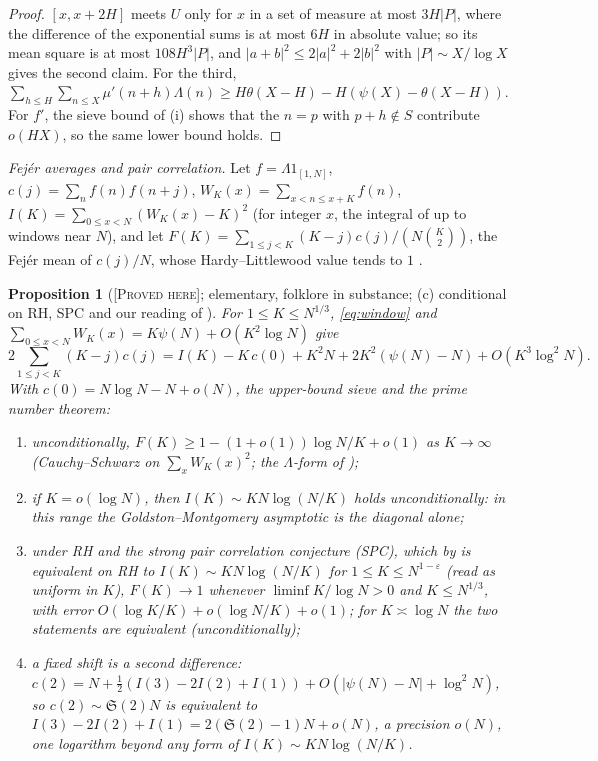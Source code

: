 \documentclass[11pt]{amsart}
\newtheorem{proposition}[theorem]{Proposition}
\theoremstyle{definition}
\theoremstyle{remark}
\newcommand{\lbl}[1]{\textup{\textsc{[#1]}}}
\begin{document}
\begin{proof}
$[x,x+2H]$ meets $U$ only for $x$ in a set of measure at most $3H|P|$, where the
difference of the exponential sums is at most $6H$ in absolute value; so its
mean square is at most $108H^3|P|$, and $|a+b|^2\le2|a|^2+2|b|^2$ with
$|P|\sim X/\log X$ gives the second claim. For the third,
$\sum_{h\le H}\sum_{n\le X}\mu'(n+h)\Lambda(n)\ge H\theta(X-H)-H(\psi(X)-\theta(X-H))$.
For $f'$, the sieve bound of (i) shows that the $n=p$ with $p+h\notin S$
contribute $o(HX)$, so the same lower bound holds.
\end{proof}

\emph{Fej\'er averages and pair correlation.} Let $f=\Lambda1_{[1,N]}$,
$c(j)=\sum_nf(n)f(n+j)$, $W_K(x)=\sum_{x<n\le x+K}f(n)$,
$I(K)=\sum_{0\le x<N}(W_K(x)-K)^2$ (for integer $x$, the integral of
\cite[Thm.~7, (9.3)]{Gol04} up to windows near $N$), and let
$F(K)=\sum_{1\le j<K}(K-j)c(j)/(N\binom K2)$, the Fej\'er mean of $c(j)/N$, whose
Hardy--Littlewood value tends to $1$ \cite[(1.5), p.~4]{Mer16}.

\begin{proposition}[\lbl{Proved here}; elementary, folklore in substance; (c) conditional on RH, SPC and our reading of \cite{Gol04}]\label{prop:gm}
For $1\le K\le N^{1/3}$, \eqref{eq:window} and $\sum_{0\le x<N}W_K(x)=K\psi(N)+O(K^2\log N)$ give
\[
2\sum_{1\le j<K}(K-j)c(j)=I(K)-K\,c(0)+K^2N+2K^2(\psi(N)-N)+O(K^3\log^2N). \tag{$*$}
\]
With $c(0)=N\log N-N+o(N)$, the upper-bound sieve and the prime number theorem:
\begin{enumerate}
\item[(a)] unconditionally, $F(K)\ge1-(1+o(1))\log N/K+o(1)$ as $K\to\infty$
  (Cauchy--Schwarz on $\sum_xW_K(x)^2$; the $\Lambda$-form of
  \cite[Main Thm.~2]{Mer16});
\item[(b)] if $K=o(\log N)$, then $I(K)\sim KN\log(N/K)$ holds unconditionally:
  in this range the Goldston--Montgomery asymptotic is the diagonal alone;
\item[(c)] under RH and the strong pair correlation conjecture (SPC), which by
  \cite[Thm.~7, (9.3)]{Gol04} is equivalent on RH to $I(K)\sim KN\log(N/K)$ for
  $1\le K\le N^{1-\varepsilon}$ (read as uniform in $K$), $F(K)\to1$ whenever
  $\liminf K/\log N>0$ and $K\le N^{1/3}$, with error $O(\log K/K)+o(\log N/K)+o(1)$; for
  $K\asymp\log N$ the two statements are equivalent (unconditionally);
\item[(d)] a fixed shift is a second difference:
  $c(2)=N+\tfrac12(I(3)-2I(2)+I(1))+O(|\psi(N)-N|+\log^2N)$, so
  $c(2)\sim\mathfrak S(2)N$ is equivalent to $I(3)-2I(2)+I(1)=2(\mathfrak S(2)-1)N+o(N)$,
  a precision $o(N)$, one logarithm beyond any form of $I(K)\sim KN\log(N/K)$.
\end{enumerate}
\end{proposition}
\end{document}
